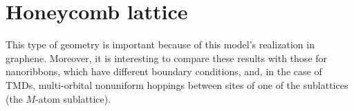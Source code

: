 \section{Honeycomb lattice}
\label{sec:honeycomb}

This type of geometry is important because of this model's realization in graphene.
Moreover, it is interesting to compare these results with those for nanoribbons, which have different boundary conditions, and, in the case of \acp{TMD}, multi-orbital nonuniform hoppings between sites of one of the sublattices (the $M$-atom sublattice).